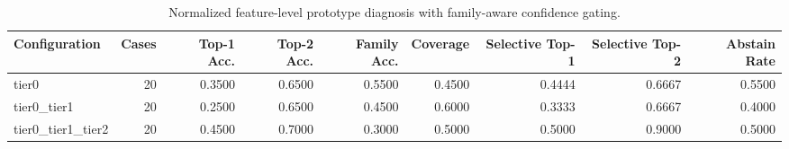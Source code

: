 \begin{table}[t]
\centering
\caption{Normalized feature-level prototype diagnosis with family-aware confidence gating.}
\label{tab:dice_stressor_hierarchical_diagnosis}
\footnotesize
\begin{tabular}{lrrrrrrrr}
\toprule
Configuration & Cases & Top-1 Acc. & Top-2 Acc. & Family Acc. & Coverage & Selective Top-1 & Selective Top-2 & Abstain Rate \\
\midrule
tier0 & 20 & 0.3500 & 0.6500 & 0.5500 & 0.4500 & 0.4444 & 0.6667 & 0.5500 \\
tier0_tier1 & 20 & 0.2500 & 0.6500 & 0.4500 & 0.6000 & 0.3333 & 0.6667 & 0.4000 \\
tier0_tier1_tier2 & 20 & 0.4500 & 0.7000 & 0.3000 & 0.5000 & 0.5000 & 0.9000 & 0.5000 \\
\bottomrule
\end{tabular}

\end{table}
